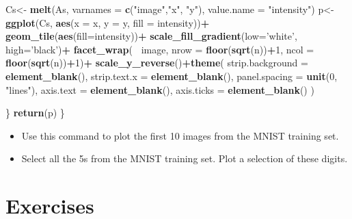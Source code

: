 \documentclass[]{book}
\newenvironment{Shaded}{\begin{snugshade}}{\end{snugshade}}
\newcommand{\DataTypeTok}[1]{\textcolor[rgb]{0.13,0.29,0.53}{#1}}
\newcommand{\DecValTok}[1]{\textcolor[rgb]{0.00,0.00,0.81}{#1}}
\newcommand{\KeywordTok}[1]{\textcolor[rgb]{0.13,0.29,0.53}{\textbf{#1}}}
\newcommand{\NormalTok}[1]{#1}
\newcommand{\OperatorTok}[1]{\textcolor[rgb]{0.81,0.36,0.00}{\textbf{#1}}}
\newcommand{\StringTok}[1]{\textcolor[rgb]{0.31,0.60,0.02}{#1}}
\theoremstyle{definition}
\theoremstyle{definition}
\theoremstyle{definition}
\theoremstyle{remark}
\begin{document}
\begin{Shaded}
\begin{Highlighting}[]
\NormalTok{    Cs<-}\StringTok{ }\KeywordTok{melt}\NormalTok{(As, }\DataTypeTok{varnames =} \KeywordTok{c}\NormalTok{(}\StringTok{"image"}\NormalTok{,}\StringTok{"x"}\NormalTok{, }\StringTok{"y"}\NormalTok{), }\DataTypeTok{value.name =} \StringTok{"intensity"}\NormalTok{)}
\NormalTok{    p<-}\KeywordTok{ggplot}\NormalTok{(Cs, }\KeywordTok{aes}\NormalTok{(}\DataTypeTok{x =}\NormalTok{ x, }\DataTypeTok{y =}\NormalTok{ y, }\DataTypeTok{fill =}\NormalTok{ intensity))}\OperatorTok{+}
\StringTok{      }\KeywordTok{geom_tile}\NormalTok{(}\KeywordTok{aes}\NormalTok{(}\DataTypeTok{fill=}\NormalTok{intensity))}\OperatorTok{+}
\StringTok{      }\KeywordTok{scale_fill_gradient}\NormalTok{(}\DataTypeTok{low=}\StringTok{'white'}\NormalTok{, }\DataTypeTok{high=}\StringTok{'black'}\NormalTok{)}\OperatorTok{+}
\StringTok{      }\KeywordTok{facet_wrap}\NormalTok{(}\OperatorTok{~}\StringTok{ }\NormalTok{image, }\DataTypeTok{nrow =} \KeywordTok{floor}\NormalTok{(}\KeywordTok{sqrt}\NormalTok{(n))}\OperatorTok{+}\DecValTok{1}\NormalTok{, }\DataTypeTok{ncol =} \KeywordTok{floor}\NormalTok{(}\KeywordTok{sqrt}\NormalTok{(n))}\OperatorTok{+}\DecValTok{1}\NormalTok{)}\OperatorTok{+}
\StringTok{      }\KeywordTok{scale_y_reverse}\NormalTok{()}\OperatorTok{+}\KeywordTok{theme}\NormalTok{(}
        \DataTypeTok{strip.background =} \KeywordTok{element_blank}\NormalTok{(),}
        \DataTypeTok{strip.text.x =} \KeywordTok{element_blank}\NormalTok{(),}
        \DataTypeTok{panel.spacing =} \KeywordTok{unit}\NormalTok{(}\DecValTok{0}\NormalTok{, }\StringTok{"lines"}\NormalTok{),}
        \DataTypeTok{axis.text =} \KeywordTok{element_blank}\NormalTok{(),}
        \DataTypeTok{axis.ticks =} \KeywordTok{element_blank}\NormalTok{()}
\NormalTok{      ) }
    
\NormalTok{  \}}
  \KeywordTok{return}\NormalTok{(p)}
\NormalTok{\}}
\end{Highlighting}
\end{Shaded}

\begin{itemize}
\item
  Use this command to plot the first 10 images from the MNIST training set.
\item
  Select all the 5s from the MNIST training set. Plot a selection of these digits.
\end{itemize}

\hypertarget{exercises}{%
\section{Exercises}\label{exercises}}
\end{document}
